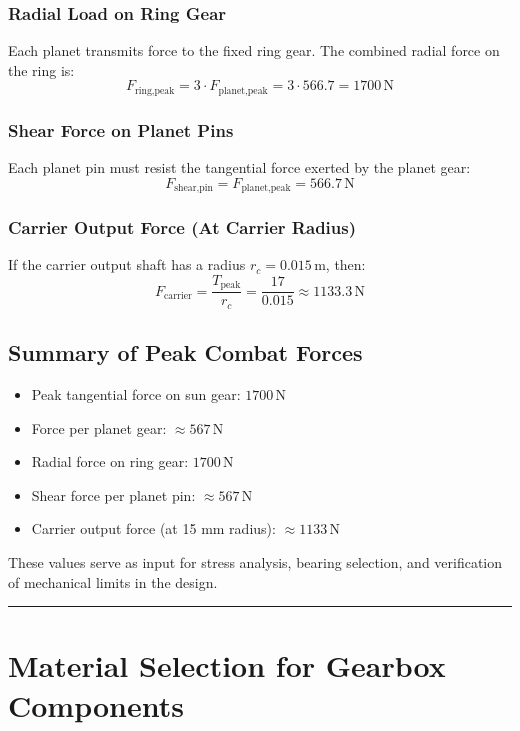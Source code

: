 \documentclass[a4paper,12pt]{article}
\begin{document}
\subsubsection*{Radial Load on Ring Gear}
Each planet transmits force to the fixed ring gear. The combined radial force on the ring is:
\[
F_{\text{ring,peak}} = 3 \cdot F_{\text{planet,peak}} = 3 \cdot 566.7 = 1700 \, \text{N}
\]

\subsubsection*{Shear Force on Planet Pins}
Each planet pin must resist the tangential force exerted by the planet gear:
\[
F_{\text{shear,pin}} = F_{\text{planet,peak}} = 566.7 \, \text{N}
\]

\subsubsection*{Carrier Output Force (At Carrier Radius)}
If the carrier output shaft has a radius \( r_c = 0.015 \, \text{m} \), then:
\[
F_{\text{carrier}} = \frac{T_{\text{peak}}}{r_c} = \frac{17}{0.015} \approx 1133.3 \, \text{N}
\]

\subsection*{Summary of Peak Combat Forces}
\begin{itemize}
    \item Peak tangential force on sun gear: \( 1700 \, \text{N} \)
    \item Force per planet gear: \( \approx 567 \, \text{N} \)
    \item Radial force on ring gear: \( 1700 \, \text{N} \)
    \item Shear force per planet pin: \( \approx 567 \, \text{N} \)
    \item Carrier output force (at 15 mm radius): \( \approx 1133 \, \text{N} \)
\end{itemize}

These values serve as input for stress analysis, bearing selection, and verification of mechanical limits in the design.

\vspace{1em}
\noindent\rule{\linewidth}{0.6pt}
\vspace{1em}

\section{Material Selection for Gearbox Components} \label{sec:material}
\end{document}

